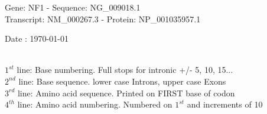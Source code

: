 \documentclass{article}
\begin{document}
\renewcommand{\footrulewidth}{1pt}
\renewcommand{\headrulewidth}{0pt}
\begin{center}
\begin{large}
Gene: NF1 - Sequence: NG\_009018.1\\
Transcript: NM\_000267.3 - Protein: NP\_001035957.1
 
 Date : \today\\\\
\end{large}
\end{center}
$1^{st}$ line: Base numbering. Full stops for intronic +/- 5, 10, 15...\\
$2^{nd}$ line: Base sequence. lower case Introns, upper case Exons\\
$3^{rd}$ line: Amino acid sequence. Printed on FIRST base of codon\\
$4^{th}$ line: Amino acid numbering. Numbered on $1^{st}$ and increments of 10\\
\end{document}
